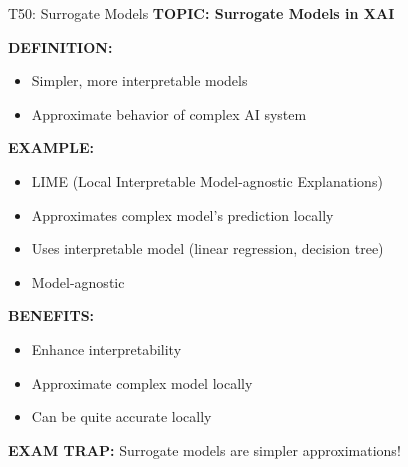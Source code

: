 \documentclass[8pt]{beamer}
\begin{document}
	\begin{frame}{T50: Surrogate Models}
		\fontsize{6.5}{7.5}\selectfont
		\textbf{TOPIC: Surrogate Models in XAI}
		
		\vspace{0.1cm}
		\textbf{DEFINITION:}
		\begin{itemize}
			\item Simpler, more interpretable models
			\item Approximate behavior of complex AI system
		\end{itemize}
		
		\vspace{0.1cm}
		\textbf{EXAMPLE:}
		\begin{itemize}
			\item LIME (Local Interpretable Model-agnostic Explanations)
			\item Approximates complex model's prediction locally
			\item Uses interpretable model (linear regression, decision tree)
			\item Model-agnostic
		\end{itemize}
		
		\vspace{0.1cm}
		\textbf{BENEFITS:}
		\begin{itemize}
			\item Enhance interpretability
			\item Approximate complex model locally
			\item Can be quite accurate locally
		\end{itemize}
		
		\textcolor{myred}{\textbf{EXAM TRAP:}} Surrogate models are \textcolor{myblue}{simpler approximations}!
	\end{frame}
	
\end{document}
